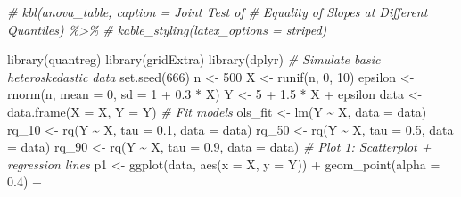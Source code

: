 \documentclass[fleqn,8pt]{latex/stylish_article} %
\newenvironment{Shaded}{\begin{snugshade}}{\end{snugshade}}
\newcommand{\DecValTok}[1]{\textcolor[rgb]{0.00,0.00,0.81}{{#1}}}
\newcommand{\FloatTok}[1]{\textcolor[rgb]{0.00,0.00,0.81}{{#1}}}
\newcommand{\SpecialCharTok}[1]{\textcolor[rgb]{0.00,0.00,0.00}{{#1}}}
\newcommand{\CommentTok}[1]{\textcolor[rgb]{0.56,0.35,0.01}{\textit{{#1}}}}
\newcommand{\OtherTok}[1]{\textcolor[rgb]{0.56,0.35,0.01}{{#1}}}
\newcommand{\FunctionTok}[1]{\textcolor[rgb]{0.00,0.00,0.00}{{#1}}}
\newcommand{\AttributeTok}[1]{\textcolor[rgb]{0.77,0.63,0.00}{{#1}}}
\newcommand{\NormalTok}[1]{{#1}}
\begin{document}
\begin{Shaded}
\begin{Highlighting}[]
\CommentTok{\# kbl(anova\_table, caption = \textquotesingle{}Joint Test of}
\CommentTok{\# Equality of Slopes at Different Quantiles\textquotesingle{}) \%\textgreater{}\%}
\CommentTok{\# kable\_styling(latex\_options = \textquotesingle{}striped\textquotesingle{})}
\end{Highlighting}
\end{Shaded}

\begin{Shaded}
\begin{Highlighting}[]
\FunctionTok{library}\NormalTok{(quantreg)}
\FunctionTok{library}\NormalTok{(gridExtra)}
\FunctionTok{library}\NormalTok{(dplyr)}
\CommentTok{\# Simulate basic heteroskedastic data}
\FunctionTok{set.seed}\NormalTok{(}\DecValTok{666}\NormalTok{)}
\NormalTok{n }\OtherTok{\textless{}{-}} \DecValTok{500}
\NormalTok{X }\OtherTok{\textless{}{-}} \FunctionTok{runif}\NormalTok{(n, }\DecValTok{0}\NormalTok{, }\DecValTok{10}\NormalTok{)}
\NormalTok{epsilon }\OtherTok{\textless{}{-}} \FunctionTok{rnorm}\NormalTok{(n, }\AttributeTok{mean =} \DecValTok{0}\NormalTok{, }\AttributeTok{sd =} \DecValTok{1} \SpecialCharTok{+} \FloatTok{0.3} \SpecialCharTok{*}\NormalTok{ X)}
\NormalTok{Y }\OtherTok{\textless{}{-}} \DecValTok{5} \SpecialCharTok{+} \FloatTok{1.5} \SpecialCharTok{*}\NormalTok{ X }\SpecialCharTok{+}\NormalTok{ epsilon}
\NormalTok{data }\OtherTok{\textless{}{-}} \FunctionTok{data.frame}\NormalTok{(}\AttributeTok{X =}\NormalTok{ X, }\AttributeTok{Y =}\NormalTok{ Y)}
\CommentTok{\# Fit models}
\NormalTok{ols\_fit }\OtherTok{\textless{}{-}} \FunctionTok{lm}\NormalTok{(Y }\SpecialCharTok{\textasciitilde{}}\NormalTok{ X, }\AttributeTok{data =}\NormalTok{ data)}
\NormalTok{rq\_10 }\OtherTok{\textless{}{-}} \FunctionTok{rq}\NormalTok{(Y }\SpecialCharTok{\textasciitilde{}}\NormalTok{ X, }\AttributeTok{tau =} \FloatTok{0.1}\NormalTok{, }\AttributeTok{data =}\NormalTok{ data)}
\NormalTok{rq\_50 }\OtherTok{\textless{}{-}} \FunctionTok{rq}\NormalTok{(Y }\SpecialCharTok{\textasciitilde{}}\NormalTok{ X, }\AttributeTok{tau =} \FloatTok{0.5}\NormalTok{, }\AttributeTok{data =}\NormalTok{ data)}
\NormalTok{rq\_90 }\OtherTok{\textless{}{-}} \FunctionTok{rq}\NormalTok{(Y }\SpecialCharTok{\textasciitilde{}}\NormalTok{ X, }\AttributeTok{tau =} \FloatTok{0.9}\NormalTok{, }\AttributeTok{data =}\NormalTok{ data)}
\CommentTok{\# Plot 1: Scatterplot + regression lines}
\NormalTok{p1 }\OtherTok{\textless{}{-}} \FunctionTok{ggplot}\NormalTok{(data, }\FunctionTok{aes}\NormalTok{(}\AttributeTok{x =}\NormalTok{ X, }\AttributeTok{y =}\NormalTok{ Y)) }\SpecialCharTok{+} \FunctionTok{geom\_point}\NormalTok{(}\AttributeTok{alpha =} \FloatTok{0.4}\NormalTok{) }\SpecialCharTok{+}

\end{Highlighting}
\end{Shaded}
\end{document}
